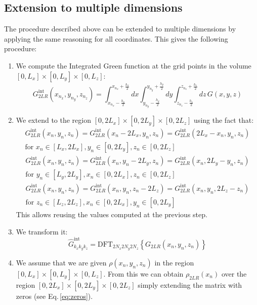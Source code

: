 \subsection{Extension to multiple dimensions}

The procedure described above can be extended to multiple dimensions by applying the same reasoning for all coordinates. 
This gives the following procedure:
\begin{enumerate}
\item We compute the Integrated Green function at the grid points in the volume $[0, L_x]\times[0, L_y]\times[0, L_z]$:
\begin{equation}
G_{2LR}^\text{int}(x_{n_x}, y_{n_y}, z_{n_z}) = 
\int_{x_{n_x}-\frac{h_x}{2}}^{x_{n_x}+\frac{h_x}{2}} dx
\int_{y_{n_y}-\frac{h_y}{2}}^{y_{n_y}+\frac{h_y}{2}} dy
\int_{z_{n_z}-\frac{h_z}{2}}^{z_{n_z}+\frac{h_z}{2}} dz\,
G(x,y,z)
\end{equation}
\item We extend to the region $[0, 2L_x]\times[0, 2L_y]\times[0, 2L_z]$ using the fact that:
\begin{multline}
G^\text{int}_{2LR}(x_n, y_n, z_n) = G^\text{int}_{2LR}(x_n-2L_x, y_n, z_n) =  G^\text{int}_{2LR}(2L_x-x_n, y_n, z_n)\\
\text{for } x_n \in [L_x, 2L_x], y_n \in [0, 2L_y], z_n \in [0, 2L_z]
\end{multline}
\begin{multline}
G^\text{int}_{2LR}(x_n, y_n, z_n) = G^\text{int}_{2LR}(x_n, y_n-2L_y, z_n) =  G^\text{int}_{2LR}(x_n, 2L_y-y_n,  z_n)\\
\text{for } y_n \in [L_y, 2L_y], x_n \in [0, 2L_x], z_n \in [0, 2L_z]
\end{multline}
\begin{multline}
G^\text{int}_{2LR}(x_n, y_n, z_n) = G^\text{int}_{2LR}(x_n, y_n, z_n-2L_z) =  G^\text{int}_{2LR}(x_n, y_n,  2L_z-z_n)\\
\text{for } z_n \in [L_z, 2L_z], x_n \in [0, 2L_x], y_n \in [0, 2L_y]
\end{multline}
This allows reusing the values computed at the previous step.
\item We transform it:
\begin{equation}
\hat{G}^\text{int}_{k_x k_y k_z} = 
\text{DFT}_{2N_x 2N_y 2N_z}\left\{ G_{2LR}(x_n, y_n, z_n)\right\}
\end{equation}
\item We assume that we are given $\rho(x_n, y_n, z_n)$ in the region $[0, L_x]\times[0, L_y]\times[0, L_z]$. From this we can obtain $\rho_{2LR}(x_n)$ over the region $[0, 2L_x]\times[0, 2L_y]\times[0, 2L_z]$ simply extending the matrix with zeros (see Eq.\,\eqref{eq:zeros}).

\end{enumerate}
